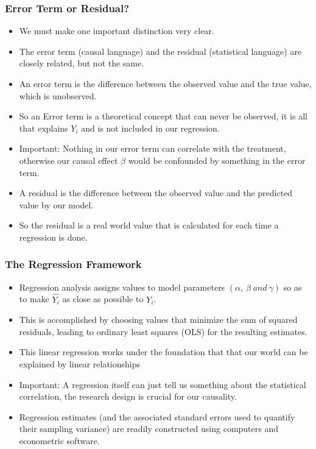\documentclass{beamer}
\begin{document}
\begin{frame}
\frametitle{Error Term or Residual?}
\begin{itemize}
	\item We must make one important distinction very clear.
	\item The error term (causal language) and the residual (statistical language) are closely related, but not the same.
	\item An error term is the difference between the observed value and the true value, which is unobserved.
	\item So an Error term is a theoretical concept that can never be observed, it is all that explains $Y_i$ and is not included in our regression.
	\item Important: Nothing in our error term can correlate with the treatment, otherwise our causal effect $\beta$ would be confounded by something in the error term.
	\item A residual is the difference between the observed value and the predicted value by our model.
	\item	So the residual is a real world value that is calculated for each time a regression is done.
	
\end{itemize}

\end{frame}

\begin{frame}
\frametitle{The Regression Framework}
\begin{itemize}
	\item Regression analysis assigns values to model parameters $(\alpha,~ \beta ~and~ \gamma)$ so as to make $\hat{Y_i}$ as close as possible to $Y_i$.
	\item This is accomplished by choosing values that minimize the sum of squared residuals, leading to ordinary least squares (OLS) for the resulting estimates.
	\item This linear regression works under the foundation that that our world can be explained by linear relationships
	\item Important: A regression itself can just tell us something about the statistical correlation, the research design is crucial for our causality.
	\item Regression estimates (and the associated standard errors used to quantify their sampling variance) are readily constructed using computers and econometric software.
	\end{itemize}
\end{frame}
\end{document}
